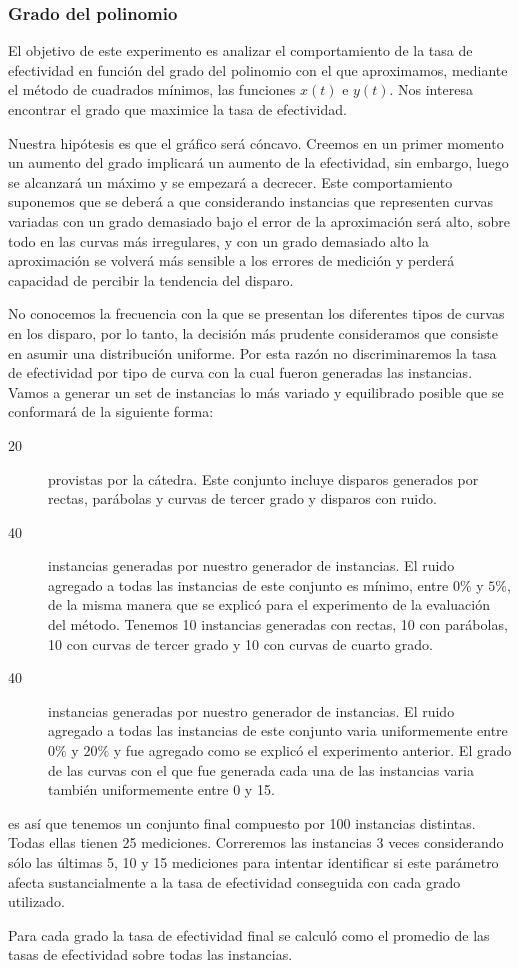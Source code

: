 \subsubsection{Grado del polinomio}
El objetivo de este experimento es analizar el comportamiento de la tasa de efectividad en función del grado del polinomio
con el que aproximamos, mediante el método de cuadrados mínimos, las funciones $x(t)$ e $y(t)$. Nos interesa encontrar 
el grado que maximice la tasa de efectividad. 
\par
Nuestra hipótesis es que el gráfico será cóncavo. Creemos en un primer
momento un aumento del grado implicará un aumento de la efectividad, sin embargo, luego se alcanzará un máximo y se 
empezará a decrecer. Este comportamiento suponemos que se deberá a que considerando instancias que representen curvas variadas 
con un grado demasiado bajo el error de la aproximación será alto, sobre todo en las curvas más irregulares, y con un 
grado demasiado alto la aproximación se volverá más sensible a los errores de medición y perderá capacidad de percibir
la tendencia del disparo.
\par
No conocemos la frecuencia con la que se presentan los diferentes tipos de curvas en los disparo, por lo tanto, la decisión
más prudente consideramos que consiste en asumir una distribución uniforme. Por esta razón no discriminaremos la tasa de efectividad
por tipo de curva con la cual fueron generadas las instancias. Vamos a generar un set de instancias lo más variado y equilibrado
posible que se conformará de la siguiente forma:
\begin{description}
	\item[20] provistas por la cátedra. Este conjunto incluye disparos generados por rectas, parábolas y curvas de tercer grado
	y disparos con ruido.
	\item[40] instancias generadas por nuestro generador de instancias. El ruido agregado a todas las instancias de este
	conjunto es mínimo, entre $0\%$ y $5\%$, de la misma manera que se explicó para el experimento de la evaluación del método. 
	Tenemos 10 instancias generadas con rectas, 10 con parábolas, 10 con curvas de tercer grado y 10 con curvas de cuarto grado.
	\item[40] instancias generadas por nuestro generador de instancias. El ruido agregado a todas las instancias de este 
	conjunto varia uniformemente entre $0\%$ y $20\%$ y fue agregado como se explicó el experimento anterior. El grado de las curvas
	con el que fue generada cada una de las instancias varia también uniformemente entre 0 y 15.
\end{description}
es así que tenemos un conjunto final compuesto por 100 instancias distintas. Todas ellas tienen 25 mediciones. Correremos
las instancias 3 veces considerando sólo las últimas 5, 10 y 15 mediciones para intentar identificar si este parámetro afecta
sustancialmente a la tasa de efectividad conseguida con cada grado utilizado.
\par
Para cada grado la tasa de efectividad final se calculó como el promedio de las tasas de efectividad sobre todas las instancias.

